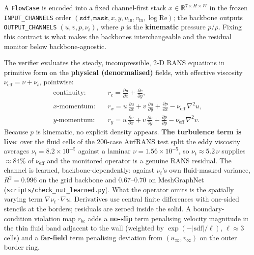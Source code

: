A \texttt{FlowCase} is encoded into a fixed channel-first stack $x \in
\mathbb{R}^{7\times H\times W}$ in the frozen \texttt{INPUT\_CHANNELS} order
$(\texttt{sdf}, \texttt{mask}, x, y, u_{\text{in}}, v_{\text{in}}, \log\text{Re})$; the
backbone outputs \texttt{OUTPUT\_CHANNELS} $(u, v, p, \nu_t)$, where $p$ is the
\textbf{kinematic} pressure $p/\rho$. Fixing this contract is what makes the backbones
interchangeable and the residual monitor below backbone-agnostic.

The verifier evaluates the steady, incompressible, 2-D RANS equations in primitive form
on the \textbf{physical (denormalised)} fields, with effective viscosity
$\nu_{\mathrm{eff}} = \nu + \nu_t$, pointwise:
\begin{align}
\text{continuity:}\quad & r_c = \frac{\partial u}{\partial x} + \frac{\partial v}{\partial y}, \\
\text{$x$-momentum:}\quad & r_x = u\,\frac{\partial u}{\partial x} + v\,\frac{\partial u}{\partial y} + \frac{\partial p}{\partial x} - \nu_{\mathrm{eff}}\,\nabla^2 u, \\
\text{$y$-momentum:}\quad & r_y = u\,\frac{\partial v}{\partial x} + v\,\frac{\partial v}{\partial y} + \frac{\partial p}{\partial y} - \nu_{\mathrm{eff}}\,\nabla^2 v.
\end{align}
Because $p$ is kinematic, no explicit density appears. \textbf{The turbulence term is
live}: over the fluid cells of the 200-case AirfRANS test split the eddy viscosity
averages $\nu_t = 8.2\times10^{-5}$ against a laminar $\nu = 1.56\times10^{-5}$, so
$\nu_t\approx5.2\,\nu$ supplies $\approx84\%$ of $\nu_{\mathrm{eff}}$ and the monitored
operator is a genuine RANS residual. The channel is learned, backbone-dependently: against
$\nu_t$'s own fluid-masked variance, $R^2 = 0.996$ on the grid backbone and
$0.67$--$0.70$ on MeshGraphNet (\texttt{scripts\slash{}check\_nut\_learned.py}). What the
operator omits is the spatially varying term $\nabla\nu_t\!\cdot\!\nabla u$. Derivatives
use central finite differences with one-sided stencils at the borders; residuals are
zeroed inside the solid. A boundary-condition violation map $r_{bc}$ adds a
\textbf{no-slip} term penalising velocity magnitude in the thin fluid band adjacent to the
wall (weighted by $\exp(-|\mathrm{sdf}|/\ell)$, $\ell\approx3$ cells) and a
\textbf{far-field} term penalising deviation from $(u_\infty, v_\infty)$ on the outer
border ring.

